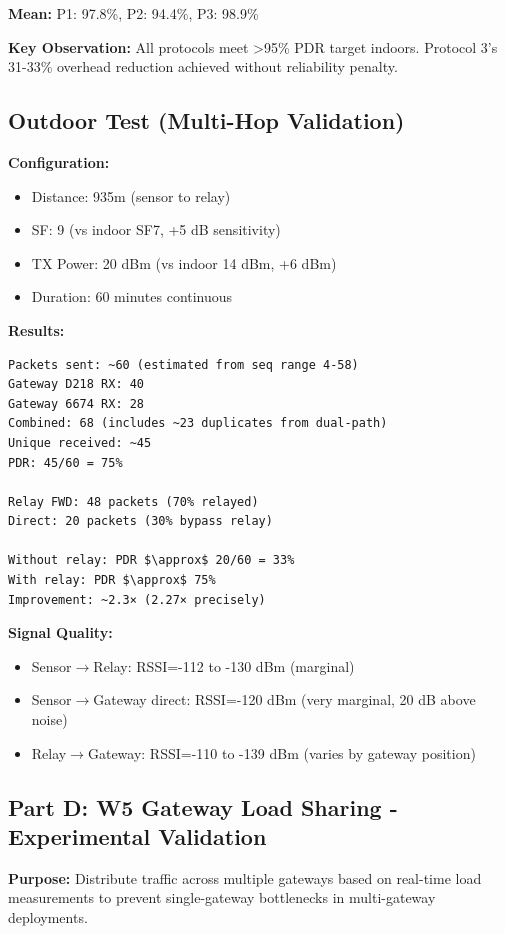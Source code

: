 \textbf{Mean:} P1: 97.8\%, P2: 94.4\%, P3: 98.9\%

\textbf{Key Observation:} All protocols meet >95\% PDR target indoors. Protocol 3's 31-33\% overhead reduction achieved without reliability penalty.

\subsection{Outdoor Test (Multi-Hop Validation)}

\textbf{Configuration:}
\begin{itemize}
\item Distance: 935m (sensor to relay)
\item SF: 9 (vs indoor SF7, +5 dB sensitivity)
\item TX Power: 20 dBm (vs indoor 14 dBm, +6 dBm)
\item Duration: 60 minutes continuous
\end{itemize}

\textbf{Results:}
\begin{verbatim}
Packets sent: ~60 (estimated from seq range 4-58)
Gateway D218 RX: 40
Gateway 6674 RX: 28
Combined: 68 (includes ~23 duplicates from dual-path)
Unique received: ~45
PDR: 45/60 = 75%

Relay FWD: 48 packets (70% relayed)
Direct: 20 packets (30% bypass relay)

Without relay: PDR $\approx$ 20/60 = 33%
With relay: PDR $\approx$ 75%
Improvement: ~2.3× (2.27× precisely)
\end{verbatim}

\textbf{Signal Quality:}
\begin{itemize}
\item Sensor$\rightarrow$Relay: RSSI=-112 to -130 dBm (marginal)
\item Sensor$\rightarrow$Gateway direct: RSSI=-120 dBm (very marginal, 20 dB above noise)
\item Relay$\rightarrow$Gateway: RSSI=-110 to -139 dBm (varies by gateway position)
\end{itemize}

\subsection{Part D: W5 Gateway Load Sharing - Experimental Validation}
\label{sec:w5-gateway}

\textbf{Purpose:} Distribute traffic across multiple gateways based on real-time load measurements to prevent single-gateway bottlenecks in multi-gateway deployments.

